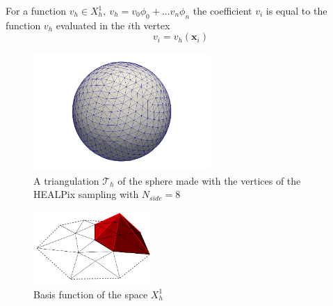 \vspace{0.5cm}
\begin{remark}
	For a function $v_h \in X^1_h,\ v_h = v_0 \phi_0 +...  v_n \phi_n$ the coefficient $v_i$ is equal to the function $v_h$ evaluated in the $i$th vertex 
	\begin{equation}\label{eq:dof and values}
	v_i = v_h(\mathbf x_i)
	\end{equation}
\end{remark}\vspace{0.5cm}
\begin{figure}[h]
	\begin{center}
		\includegraphics[width=0.6\textwidth]{figs/Chapter3/sphere_mesh.png}
	\end{center}
	\caption{\label{fig:sphere mesh}A triangulation $\mathcal T_h$ of the sphere made with the vertices of the HEALPix sampling with $N_{side}=8$}
\end{figure}
\begin{figure}
	\begin{center}
		\includegraphics[width=0.4\textwidth]{figs/Chapter3/basisfunction.png}
	\end{center}
	\caption{\label{fig:basis function}Basis function of the space $X^{1}_h$}
\end{figure}

